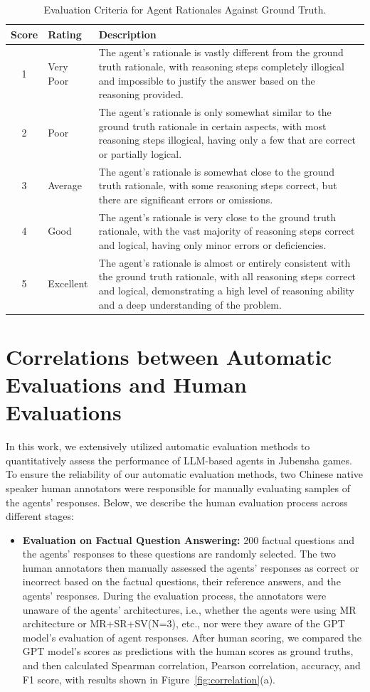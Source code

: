 \documentclass[11pt]{article}
\begin{document}
{\begin{table}[thbp]
\centering
\begin{tabular}{clp{10cm}}
\toprule
Score & Rating & Description \\
\midrule
1 & Very Poor & The agent's rationale is vastly different from the ground truth rationale, with reasoning steps completely illogical and impossible to justify the answer based on the reasoning provided. \\
2 & Poor & The agent's rationale is only somewhat similar to the ground truth rationale in certain aspects, with most reasoning steps illogical, having only a few that are correct or partially logical. \\
3 & Average & The agent's rationale is somewhat close to the ground truth rationale, with some reasoning steps correct, but there are significant errors or omissions. \\
4 & Good & The agent's rationale is very close to the ground truth rationale, with the vast majority of reasoning steps correct and logical, having only minor errors or deficiencies. \\
5 & Excellent & The agent's rationale is almost or entirely consistent with the ground truth rationale, with all reasoning steps correct and logical, demonstrating a high level of reasoning ability and a deep understanding of the problem. \\
\bottomrule
\end{tabular}
\caption{Evaluation Criteria for Agent Rationales Against Ground Truth.}
\label{table:eval_criteria}
\end{table}

\section{Correlations between Automatic Evaluations and Human Evaluations}

In this work, we extensively utilized automatic evaluation methods to quantitatively assess the performance of LLM-based agents in Jubensha games. To ensure the reliability of our automatic evaluation methods, two Chinese native speaker human annotators were responsible for manually evaluating samples of the agents' responses. Below, we describe the human evaluation process across different stages:

\begin{itemize}
    \item \textbf{Evaluation on Factual Question Answering:} 200 factual questions and the agents' responses to these questions are randomly selected. The two human annotators then manually assessed the agents' responses as correct or incorrect based on the factual questions, their reference answers, and the agents' responses. During the evaluation process, the annotators were unaware of the agents' architectures, i.e., whether the agents were using MR architecture or MR+SR+SV(N=3), etc., nor were they aware of the GPT model's evaluation of agent responses. After human scoring, we compared the GPT model's scores as predictions with the human scores as ground truths, and then calculated Spearman correlation, Pearson correlation, accuracy, and F1 score, with results shown in Figure~\ref{fig:correlation}(a).


\end{itemize}}
\end{document}
